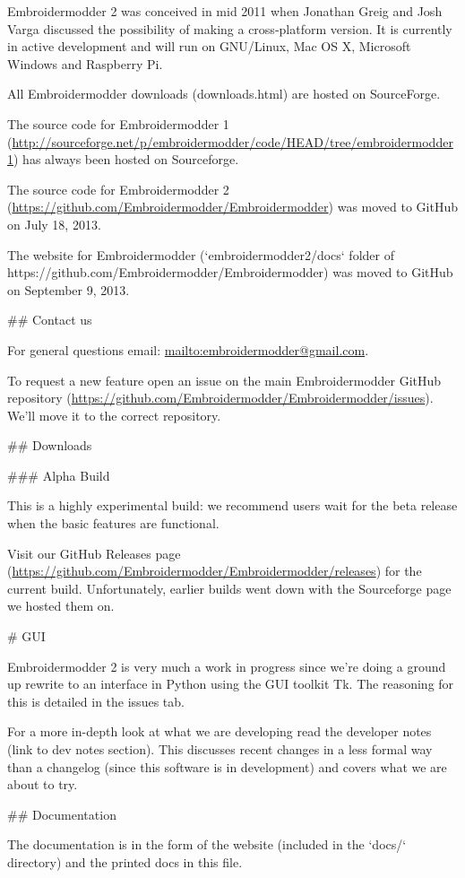 Embroidermodder 2 was conceived in mid 2011 when Jonathan Greig and Josh Varga
discussed the possibility of making a cross-platform version. It is currently in
active development and will run on GNU/Linux, Mac OS X, Microsoft Windows and
Raspberry Pi.

All Embroidermodder downloads (downloads.html) are hosted on SourceForge.

The source code for Embroidermodder 1
(\url{http://sourceforge.net/p/embroidermodder/code/HEAD/tree/embroidermodder1})
has always been hosted on Sourceforge.

The source code for Embroidermodder 2
(\url{https://github.com/Embroidermodder/Embroidermodder}) was moved to GitHub
on July 18, 2013.

The website for Embroidermodder (`embroidermodder2/docs` folder of
https://github.com/Embroidermodder/Embroidermodder) was moved to
GitHub on September 9, 2013.

## Contact us

For general questions email: \url{mailto:embroidermodder@gmail.com}.

To request a new feature  open an issue on the main Embroidermodder GitHub
repository (\url{https://github.com/Embroidermodder/Embroidermodder/issues}).
We'll move it to the correct repository.

## Downloads

### Alpha Build

This is a highly experimental build: we recommend users wait for the beta
release when the basic features are functional.

Visit our  GitHub Releases page
(\url{https://github.com/Embroidermodder/Embroidermodder/releases})
for the current build. Unfortunately, earlier builds went down with the
Sourceforge page we hosted them on.

# GUI

Embroidermodder 2 is very much a work in progress since we're doing a ground
up rewrite to an interface in Python using the GUI toolkit Tk. The reasoning for
this is detailed in the issues tab.

For a more in-depth look at what we are developing read the developer notes (link to dev notes
section). This discusses recent changes in a less formal way than a changelog (since this
software is in development) and covers what we are about to try.

## Documentation

The documentation is in the form of the website
(included in the `docs/` directory) and the printed docs in this file.

